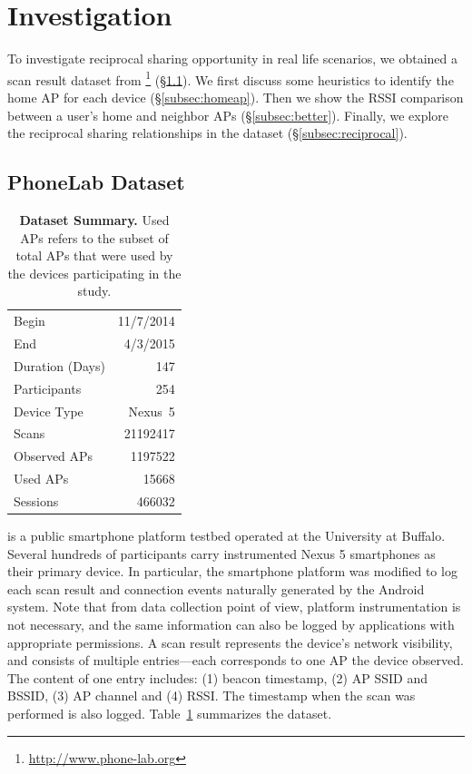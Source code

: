 \section{Investigation}
\label{sec:investigation}

To investigate reciprocal sharing opportunity in real life scenarios, we
obtained a \wifi{} scan result dataset from
\PhoneLab{}\footnote{\url{http://www.phone-lab.org}} (\S\ref{subsec:phonelab}).
We first discuss some heuristics to identify the home AP for each device
(\S\ref{subsec:homeap}). Then we show the RSSI comparison between a user's
home and neighbor APs (\S\ref{subsec:better}). Finally, we explore the
reciprocal sharing relationships in the dataset (\S\ref{subsec:reciprocal}).

\subsection{PhoneLab \wifi{} Dataset}
\label{subsec:phonelab}

\begin{table}[t]
  \begin{tabularx}{\columnwidth}{Xr}
    \toprule
    Begin & 11/7/2014 \\ 
    End & 4/3/2015 \\ 
    Duration (Days) & 147 \\ \midrule
    Participants & 254 \\
    Device Type & Nexus~5 \\ \midrule
    Scans & \num{21192417} \\
    Observed APs & \num{1197522} \\
    Used APs & \num{15668} \\ \midrule
    \wifi{} Sessions & \num{466032} \\
    \bottomrule
  \end{tabularx}
  \caption{\textbf{\PhoneLab{} \wifi{} Dataset Summary.} Used APs refers to the
  subset of total APs that were used by the devices participating in the study.}
  \label{tab:summary}
  \vspace*{-3mm}
\end{table}

\PhoneLab{}\cite{phonelab-sensemine13} is a public smartphone platform
testbed operated at the University at Buffalo. Several hundreds of
participants carry instrumented Nexus 5 smartphones as their primary device.
In particular, the smartphone platform was modified to log each \wifi{} scan
result and \wifi{} connection events naturally generated by the Android
system. Note that from data collection point of view, platform
instrumentation is not necessary, and the same information can also be logged
by applications with appropriate permissions. A \wifi{} scan result
represents the device's network visibility, and consists of multiple
entries---each corresponds to one \wifi{} AP the device observed. The content
of one entry includes: (1) beacon timestamp, (2) AP SSID and BSSID, (3) AP
channel and (4) RSSI. The timestamp when the scan was performed is also
logged. Table~\ref{tab:summary} summarizes the \PhoneLab{} \wifi{} dataset.

